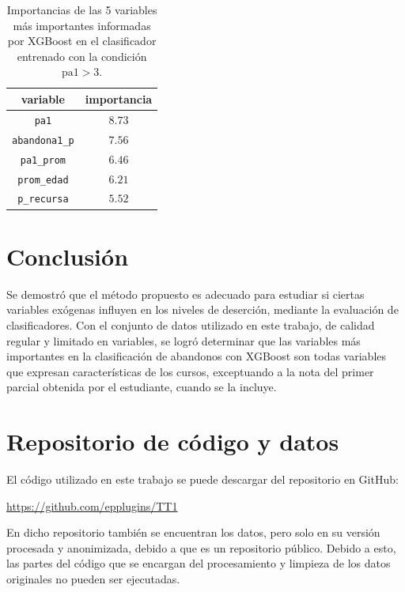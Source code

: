 \documentclass[a4paper,11pt,dvipsnames]{article}
\begin{document}
\begin{table}[!ht]
    \caption{Importancias de las 5 variables más importantes informadas por XGBoost en el clasificador entrenado con la condición $\text{pa1} > 3$.}
    \begin{center}
    \begin{tabular}{cc}
    \hline
    \textbf{variable} & \textbf{importancia}\\
    \hline
    \texttt{pa1}  & $8.73$\\
    \texttt{abandona1\_p} & $7.56$\\
    \texttt{pa1\_prom} & $6.46$ \\
    \texttt{prom\_edad} & $6.21$\\
    \texttt{p\_recursa} & $5.52$\\
    \hline
    \end{tabular}
    \label{tab:impbase2}
    \end{center}
\end{table}


\section{Conclusión}

Se demostró que el método propuesto es adecuado para estudiar si ciertas variables exógenas influyen en los niveles de deserción, mediante la evaluación de clasificadores. Con el conjunto de datos utilizado en este trabajo, de calidad regular y limitado en variables, se logró determinar que las variables más importantes en la clasificación de abandonos con XGBoost son todas variables que expresan características de los cursos, exceptuando a la nota del primer parcial obtenida por el estudiante, cuando se la incluye.\par\medskip 

\printbibliography
{}%

\appendix

\section{Repositorio de código y datos}

El código utilizado en este trabajo se puede descargar del repositorio en GitHub:\par\medskip

\url{https://github.com/epplugins/TT1} \par\medskip 

En dicho repositorio también se encuentran los datos, pero solo en su versión procesada y anonimizada, debido a que es un repositorio público. Debido a esto, las partes del código que se encargan del procesamiento y limpieza de los datos originales no pueden ser ejecutadas.\par\medskip 
\end{document}
